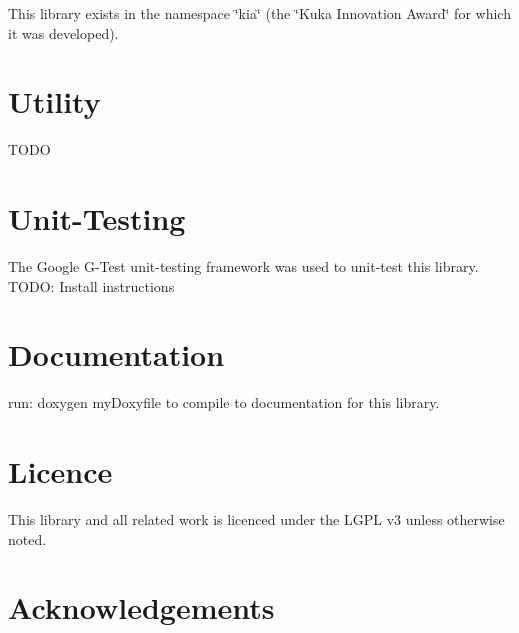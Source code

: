 This library exists in the namespace \char`\"{}kia\char`\"{} (the \char`\"{}\-Kuka Innovation Award\char`\"{} for which it was developed).\hypertarget{index_Stand-Alone}{}\section{Utility}\label{index_Stand-Alone}
T\-O\-D\-O\hypertarget{index_Unit-Testing}{}\section{Unit-\/\-Testing}\label{index_Unit-Testing}
The Google G-\/\-Test unit-\/testing framework was used to unit-\/test this library. T\-O\-D\-O\-: Install instructions\hypertarget{index_Documentation}{}\section{Documentation}\label{index_Documentation}
run\-: doxygen my\-Doxyfile to compile to documentation for this library.\hypertarget{index_Licence}{}\section{Licence}\label{index_Licence}
This library and all related work is licenced under the L\-G\-P\-L v3 unless otherwise noted.\hypertarget{README.md_Acknowledgements}{}\section{Acknowledgements}\label{README.md_Acknowledgements}
